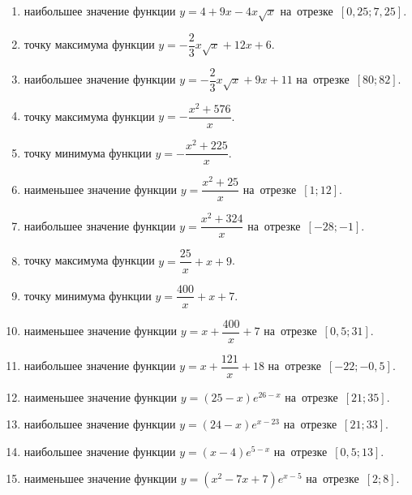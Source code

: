 \documentclass[a4paper,10pt]{article}
\begin{document}
\begin{enumerate}
\item {} наибольшее значение функции $y=4+9x -4x\sqrt{x}$ на~отрезке~$\left[0,25;7,25\right]$.

\item {} точку максимума функции $y=-\dfrac{2}{3}x\sqrt{x} +12x+6$.

\item {} наибольшее значение функции $y=-\dfrac{2}{3}x\sqrt{x} +9x+11$ на~отрезке~$\left[80;82\right]$.

\item {} точку максимума функции $y=-\dfrac{x^2 +576}{x}$.

\item {} точку минимума функции $y=-\dfrac{x^2 +225}{x}$.

\item {} наименьшее значение функции $y=\dfrac{x^2 +25}{x}$ на~отрезке~$\left[1;12\right]$.

\item {} наибольшее значение функции $y=\dfrac{x^2 +324}{x}$ на~отрезке~$\left[-28;-1\right]$.

\item {} точку максимума функции $y=\dfrac{25}{x} +x+9$.

\item {} точку минимума функции $y=\dfrac{400}{x} +x+7$.

\item {} наименьшее значение функции $y=x+\dfrac{400}{x} +7$ на~отрезке~$\left[0,5;31\right]$.

\item {} наибольшее значение функции $y=x+\dfrac{121}{x} +18$ на~отрезке~$\left[-22;-0,5\right]$.

\item {} наименьшее значение функции $y=\left(25-x\right)e^{26-x}$ на~отрезке~$\left[21;35\right]$.

\item {} наибольшее значение функции $y=\left(24-x\right)e^{x-23}$ на~отрезке~$\left[21;33\right]$.

\item {} наибольшее значение функции $y=\left(x-4\right)e^{5-x}$ на~отрезке~$\left[0,5;13\right]$.

\item {} наименьшее значение функции $y=\left(x^2 -7x +7\right)e^{x -5}$ на~отрезке~$\left[2;8\right]$.


\end{enumerate}
\end{document}
